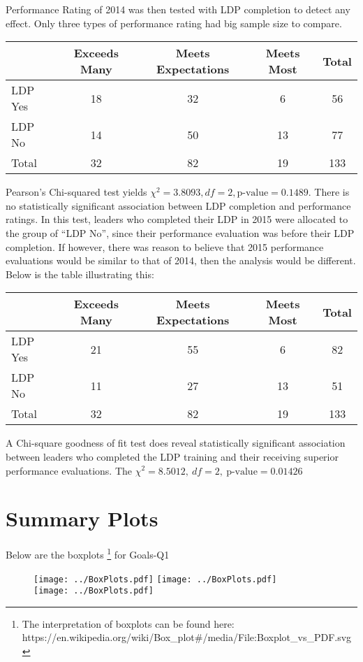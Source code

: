 \documentclass[11pt]{extarticle} %
\begin{document}
Performance Rating of 2014 was then tested with LDP completion to detect any effect. Only three types of performance rating had big sample size to compare. 
\begin{table}[H]
\centering
\begin{tabular}{lcccc}
 \hline
 & Exceeds Many & Meets Expectations & Meets Most & Total\\ 
 \hline
 LDP Yes &  18 &  32 &   6 & 56\\ 
 LDP No &  14 &  50 &  13 & 77\\ 
 \hline
 Total & 32 & 82 & 19 & 133 \\
 \hline
\end{tabular}
\end{table}
Pearson's Chi-squared test yields $\chi^2 = 3.8093, df = 2, \text{p-value} = 0.1489$. There is no statistically significant association between LDP completion and performance ratings. In this test, leaders who completed their LDP in 2015 were allocated to the group of ``LDP No'', since their performance evaluation was before their LDP completion. If however, there was reason to believe that 2015 performance evaluations would be similar to that of 2014, then the analysis would be different. Below is the table illustrating this:
\begin{table}[H]
\centering
\begin{tabular}{lcccc}
\hline
& Exceeds Many & Meets Expectations & Meets Most & Total\\ 
\hline
LDP Yes &  21 &  55 &   6  & 82\\ 
LDP No &  11 &  27 &  13 & 51\\ 
\hline
Total & 32 & 82 & 19 & 133 \\
\hline
\end{tabular}
\end{table}
A Chi-square goodness of fit test does reveal statistically significant association between leaders who completed the LDP training and their receiving superior performance evaluations. The $\chi^2 = 8.5012,\ df = 2,\  \text{p-value} = 0.01426$

\newpage

\section*{Summary Plots}
Below are the boxplots {\footnote{The interpretation of boxplots can be found here: https://en.wikipedia.org/wiki/Box\_plot\#/media/File:Boxplot\_vs\_PDF.svg}} for Goals-Q1
\begin{figure}[H]
\centering 
\texttt{[image: ../BoxPlots.pdf]}
\texttt{[image: ../BoxPlots.pdf]} \\
\texttt{[image: ../BoxPlots.pdf]}
\end{figure}
\end{document}
